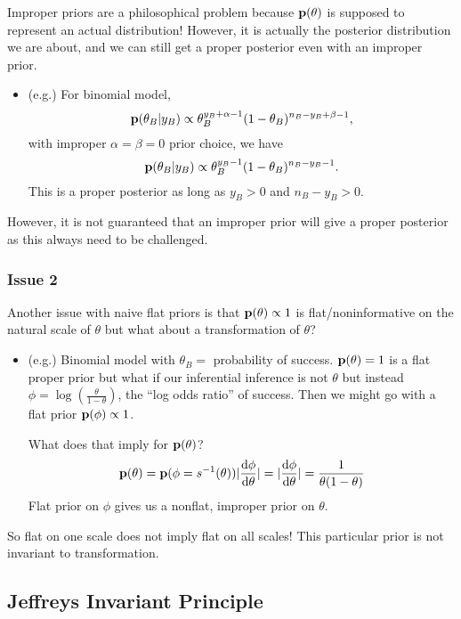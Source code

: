 Improper priors are a philosophical problem because ${\mathbf p}(\theta)$ is supposed to represent an actual distribution! However, it is actually the posterior distribution we are about, and we can still get a proper posterior even with an improper prior.
\begin{itemize}
    \item (e.g.) For binomial model,
    \[
        {\mathbf p}(\theta_B| y_B) \propto \theta_B^{y_B+\alpha-1}(1-\theta_B)^{n_B - y_B + \beta - 1},
    \]
    with improper $\alpha=\beta=0$ prior choice, we have
    \[ 
        {\mathbf p}(\theta_B|y_B) \propto \theta_B^{y_B-1} (1-\theta_B)^{n_B - y_B -1}.
    \]
    This is a proper posterior as long as $y_B > 0$ and $n_B - y_B > 0$.
\end{itemize}

However, it is not guaranteed that an improper prior will give a proper posterior as this always need to be challenged.

\subsubsection*{Issue 2}

Another issue with naive flat priors is that ${\mathbf p}(\theta) \propto 1$ is flat/noninformative on the natural scale of $\theta$ but what about a transformation of $\theta$?

\begin{itemize}
    \item (e.g.) Binomial model with $\theta_B = $ probability of success. ${\mathbf p}(\theta) = 1$  is a flat proper prior but what if our inferential inference is not $\theta$ but instead $\phi = \log(\frac{\theta}{1-\theta})$, the ``log odds ratio'' of success. Then we might go with a flat prior ${\mathbf p}(\phi) \propto 1$. 
    
    What does that imply for ${\mathbf p}(\theta)$?
    \[
     {\mathbf p}(\theta) = {\mathbf p}(\phi = s^{-1}(\theta))|\frac{\mathop{}\!\mathrm{d} \phi}{\mathop{}\!\mathrm{d} \theta}| = |\frac{\mathop{}\!\mathrm{d} \phi}{\mathop{}\!\mathrm{d} \theta}| = \frac{1}{\theta(1 - \theta)}
     \]
     Flat prior on $\phi$ gives us a nonflat, improper prior on $\theta$.
\end{itemize}

So flat on one scale does not imply flat on all scales! This particular prior is not invariant to transformation.

\subsection{Jeffreys Invariant Principle}

